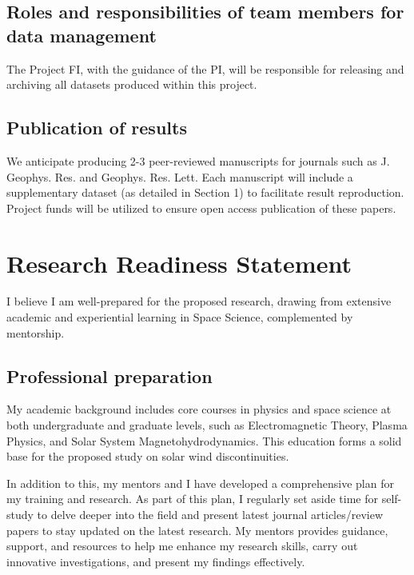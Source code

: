 \documentclass[
  letterpaper,
  DIV=11,
  numbers=noendperiod]{scrartcl}
\begin{document}
\subsection{Roles and responsibilities of team members for data
management}\label{roles-and-responsibilities-of-team-members-for-data-management}

The Project FI, with the guidance of the PI, will be responsible for
releasing and archiving all datasets produced within this project.

\subsection{Publication of results}\label{publication-of-results}

We anticipate producing 2-3 peer-reviewed manuscripts for journals such
as J. Geophys. Res. and Geophys. Res. Lett. Each manuscript will include
a supplementary dataset (as detailed in Section 1) to facilitate result
reproduction. Project funds will be utilized to ensure open access
publication of these papers.

\newpage{}

\section{Research Readiness
Statement}\label{research-readiness-statement}

I believe I am well-prepared for the proposed research, drawing from
extensive academic and experiential learning in Space Science,
complemented by mentorship.

\subsection{Professional preparation}\label{professional-preparation}

My academic background includes core courses in physics and space
science at both undergraduate and graduate levels, such as
Electromagnetic Theory, Plasma Physics, and Solar System
Magnetohydrodynamics. This education forms a solid base for the proposed
study on solar wind discontinuities.

In addition to this, my mentors and I have developed a comprehensive
plan for my training and research. As part of this plan, I regularly set
aside time for self-study to delve deeper into the field and present
latest journal articles/review papers to stay updated on the latest
research. My mentors provides guidance, support, and resources to help
me enhance my research skills, carry out innovative investigations, and
present my findings effectively.
\end{document}
